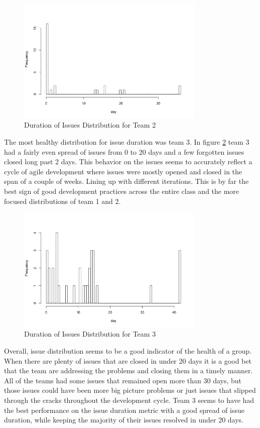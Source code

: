 \documentclass[conference]{IEEEtran}
\begin{document}
\begin{figure}[H]
    \centering
    \includegraphics[width=9cm]{../AprilProject/pic/distribution/issue_duration_distribution_team2.png}
    \caption{Duration of Issues Distribution for Team 2}
    \label{issue_duration_team2}
\end{figure}

The most healthy distribution for issue duration was team 3. In figure \ref{issue_duration_team3} team 3 had a fairly even spread of issues from 0 to 20 days and a few forgotten issues closed long past 2 days. This behavior on the issues seems to accurately reflect a cycle of agile development where issues were mostly opened and closed in the span of a couple of weeks. Lining up with different iterations. This is by far the best sign of good development practices across the entire class and the more focused distributions of team 1 and 2. 

\begin{figure}[H]
    \centering
    \includegraphics[width=9cm]{../AprilProject/pic/distribution/issue_duration_distribution_team3.png}
    \caption{Duration of Issues Distribution for Team 3}
    \label{issue_duration_team3}
\end{figure}

Overall, issue distribution seems to be a good indicator of the health of a group. When there are plenty of issues that are closed in under 20 days it is a good bet that the team are addressing the problems and closing them in a timely manner. All of the teams had some issues that remained open more than 30 days, but those issues could have been more big picture problems or just issues that slipped through the cracks throughout the development cycle. Team 3 seems to have had the best performance on the issue duration metric with a good spread of issue duration, while keeping the majority of their issues resolved in under 20 days. 
\end{document}
